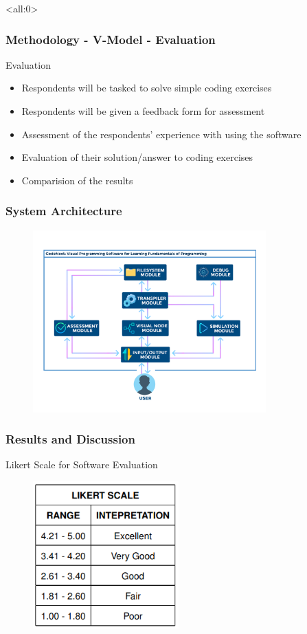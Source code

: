\documentclass{beamer}
\begin{document}
\begin{frame}<all:0>
	\frametitle{Methodology - V-Model - Evaluation}
	\begin{block}{Evaluation}
		\begin{itemize}
			\item<1-> Respondents will be tasked to solve simple coding exercises
			\item<2-> Respondents will be given a feedback form for assessment
			\item<3-> Assessment of the respondents' experience with using the software
			\item<4-> Evaluation of their solution/answer to coding exercises
			\item<5-> Comparision of the results
		\end{itemize}
	\end{block}
\end{frame}

\begin{frame}
	\frametitle{System Architecture}
	\begin{figure}
		\includegraphics[width=0.8\textwidth]{figures/theoretical_framework.png}
	\end{figure}
\end{frame}

\begin{frame}
	\frametitle{Results and Discussion}
	\begin{block}{Likert Scale for Software Evaluation}
		\begin{figure}
			\includegraphics[width=0.5\textwidth]{figures/likert_scale.png}
		\end{figure}
	\end{block}
\end{frame}
\end{document}
